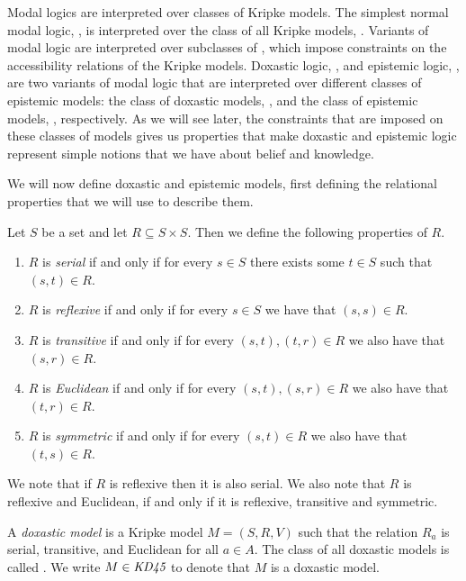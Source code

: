 Modal logics are interpreted over classes of Kripke models. The simplest normal
modal logic, \logicK{}, is interpreted over the class of all Kripke models,
\classK{}. Variants of modal logic are interpreted over subclasses of \classK{},
which impose constraints on the accessibility relations of the Kripke models.
Doxastic logic, \logicKD{}, and epistemic logic, \logicS{}, are two variants of
modal logic that are interpreted over different classes of epistemic models: the
class of doxastic models, \classKD{}, and the class of epistemic models,
\classS{}, respectively. As we will see later, the constraints that are imposed
on these classes of models gives us properties that make doxastic and epistemic
logic represent simple notions that we have about belief and knowledge.

We will now define doxastic and epistemic models, first defining the relational
properties that we will use to describe them.

\begin{definition}
Let $S$ be a set and let $R \subseteq S \times S$. Then we define the following
properties of $R$.
\begin{enumerate}
\item $R$ is {\em serial} if and only if for every $s \in S$ there
exists some $t \in S$ such that $(s, t) \in R$.
\item $R$ is {\em reflexive} if and only if for every $s \in S$ we
have that $(s, s) \in R$.
\item $R$ is {\em transitive} if and only if for every $(s, t), (t, r)
\in R$ we also have that $(s, r) \in R$.
\item $R$ is {\em Euclidean} if and only if for every $(s, t), (s, r)
\in R$ we also have that $(t, r) \in R$.
\item $R$ is {\em symmetric} if and only if for every $(s, t) \in R$
we also have that $(t, s) \in R$.
\end{enumerate}
\end{definition}

We note that if $R$ is reflexive then it is also serial. We also note that 
$R$ is reflexive and Euclidean, if and only if it is reflexive, transitive and
symmetric.

\begin{definition}
A \textit{doxastic model} is a Kripke model $M = (S, R, V)$ such that the
relation $R_a$ is serial, transitive, and Euclidean for all $a \in A$. The class
of all doxastic models is called \classKD{}. We write $M \in \textit{KD45}{}$ to
denote that $M$ is a doxastic model.
\end{definition}

